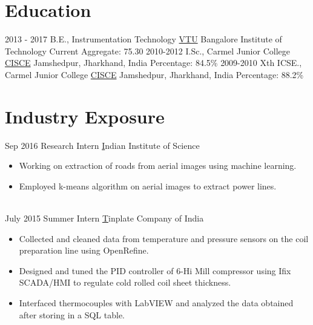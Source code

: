 \documentclass[letterpaper]{twentysecondcv} %
\begin{document}
\makeprofile %

\section{Education}

\begin{twenty} %
	\twentyitem
    	{2013 - 2017}
        {B.E., Instrumentation Technology}
        {\href{http://vtu.ac.in/}{VTU}}
        {Bangalore Institute of Technology}
        {Current Aggregate: 75.30}
	\twentyitem
    	{2010-2012}
        {I.Sc., Carmel Junior College}
        {\href{http://cisce.org/}{CISCE}}
        {Jamshedpur, Jharkhand, India}
        {Percentage: 84.5\%}
        	\twentyitem
    	{2009-2010}
        {Xth ICSE., Carmel Junior College}
        {\href{http://cisce.org/}{CISCE}}
        {Jamshedpur, Jharkhand, India}
        {Percentage: 88.2\%}
       
	
\end{twenty}


\section{Industry Exposure}
\begin{twenty}

\twentyitem
    	{Sep 2016}
        {Research Intern}
        {\href{http://www.iisc.ac.in/}Indian Institute of Science}
        {}
        {
        {\begin{itemize}
        \item Working on extraction of roads from aerial images using machine learning.
        \item Employed k-means algorithm on aerial images to extract power lines.
 
    \end{itemize}}
        }
\\

	\twentyitem
    	{July 2015}
        {Summer Intern}
        {\href{http://www.tatatinplate.com/}Tinplate Company of India}
        {}
        {
        {\begin{itemize}
        \item Collected and cleaned data from temperature and pressure sensors on the coil preparation line using OpenRefine.
        \item Designed and tuned the PID controller of 6-Hi Mill compressor using Ifix SCADA/HMI to regulate cold rolled coil sheet thickness.
        \item Interfaced thermocouples with LabVIEW and analyzed the data obtained after storing in a SQL table. 
    \end{itemize}}
        }
\\

\end{twenty}
\end{document}

